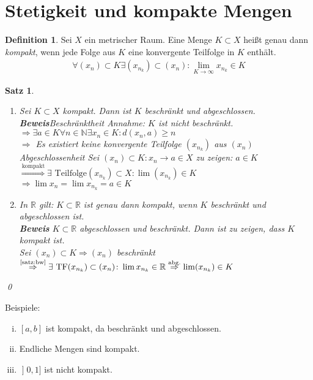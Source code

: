 \documentclass[ngerman,titlepage,twoside, parskip=half*]{scrreprt}
\newcommand*{\N}{\mathbb{N}}
\newcommand*{\R}{\mathbb{R}}
\theoremstyle{plain}
\newtheorem{theorem}{Satz}[section]
\theoremstyle{definition}
\newtheorem{definition}{Definition}
\theoremstyle{remark}
\newcommand*{\lsofint}[1]{\mathopen{]}#1]}   %
\begin{document}
\section{Stetigkeit und kompakte Mengen}
\begin{definition}
Sei $X$ ein metrischer Raum. Eine Menge $K\subset X$ heißt genau dann \emph{kompakt},
wenn jede Folge aus $K$ eine konvergente Teilfolge in $K$ enthält.
\begin{gather*}\forall (x_n) \subset K \exists (x_{n_k})\subset (x_n)\colon\lim_{K\rightarrow \infty} x_{n_k}\in K\end{gather*}
\end{definition}

\begin{theorem}
\label{satz:beschr-abg}
\begin{enumerate}[(1)]
  \item Sei $K\subset X$ kompakt. Dann ist $K$ beschränkt und abgeschlossen.\\
    \textbf{Beweis}\textit{Beschränktheit} Annahme: $K$ ist nicht beschränkt.\\
    $\Rightarrow \exists a \in K \forall n \in \N \exists x_n \in K\colon d(x_n,a)\geq n$\\
    $\Rightarrow$ Es existiert keine konvergente Teilfolge $(x_{n_k})$ aus $(x_n)$\textnormal{\lightning}\\
    \textit{Abgeschlossenheit} Sei $(x_n)\subset K \colon x_n \rightarrow a\in X$ zu zeigen: $a\in K$\\
    $\stackrel{\text{kompakt}}{\Rightarrow} \exists \text{ Teilfolge} (x_{n_k})\subset X \colon\lim (x_{n_k})\in K$\\
    $\Rightarrow \lim x_n=\lim x_{n_k}=a\in K$
  \item In $\R$ gilt: $K\subset \R$ ist genau dann kompakt, wenn $K$ beschränkt und abgeschlossen ist.\\
    \textbf{Beweis} $K\subset \R$ abgeschlossen und beschränkt. Dann ist zu zeigen, dass $K$ kompakt ist.\\
    Sei $(x_n)\subset K \Rightarrow (x_n)$ beschränkt $\stackrel{\text{\autoref{satz:bw}}}{\Rightarrow}
    \exists \text{ TF} (x_{n_k})\subset (x_n)\colon \lim x_{n_k}\in\R\stackrel{\text{abg.}}{\Rightarrow}
    \lim (x_{n_k})\in K$
\end{enumerate}
\qed
\end{theorem}

Beispiele:
\begin{enumerate}[(i)]
  \item $[a,b]$ ist kompakt, da beschränkt und abgeschlossen.
  \item Endliche Mengen sind kompakt.
  \item $\lsofint{0,1}$ ist nicht kompakt.
\end{enumerate}
\end{document}
